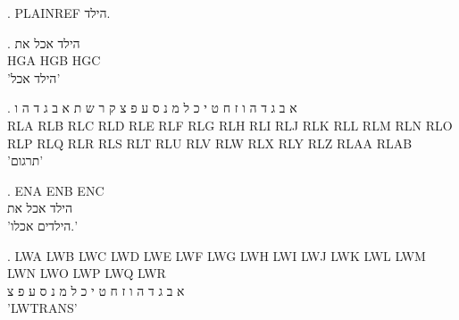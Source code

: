 

\ex. PLAINREF הילד.

\ex. \gll הילד אכל את\\
          HGA HGB HGC\\
\glt 'הילד אכל'

\ex. \gll א ב ג ד ה ו ז ח ט י כ ל מ נ ס ע פ צ ק ר ש ת א ב ג ד ה ו\\
          RLA RLB RLC RLD RLE RLF RLG RLH RLI RLJ RLK RLL RLM RLN RLO RLP RLQ RLR RLS RLT RLU RLV RLW RLX RLY RLZ RLAA RLAB\\
\glt 'תרגום'

\begin{english}
\ex. \gll ENA ENB ENC\\
          הילד אכל את\\
\glt 'הילדים אכלו.'

\ex. \gll LWA LWB LWC LWD LWE LWF LWG LWH LWI LWJ LWK LWL LWM LWN LWO LWP LWQ LWR\\
          א ב ג ד ה ו ז ח ט י כ ל מ נ ס ע פ צ\\
\glt 'LWTRANS'
\end{english}

